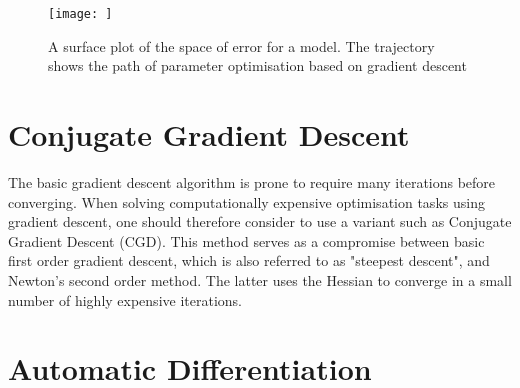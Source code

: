 \begin{figure}
    \centering
    \texttt{[image: ]}
    \caption{A surface plot of the space of error for a model. The trajectory shows the path of parameter optimisation based on gradient descent}
    \label{fig:GD_surface}
\end{figure}

\section{Conjugate Gradient Descent}


The basic gradient descent algorithm is prone to require many iterations before converging. When solving computationally expensive optimisation tasks using gradient descent, one should therefore consider to use a variant such as Conjugate Gradient Descent (CGD). This method serves as a compromise between basic first order gradient descent, which is also referred to as "steepest descent", and Newton's second order method. The latter uses the Hessian to converge in a small number of highly expensive iterations.




\section{Automatic Differentiation}

